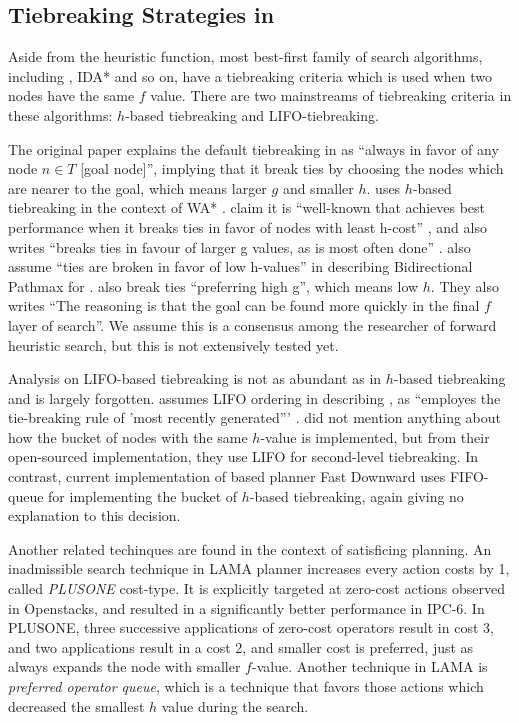 \subsection{Tiebreaking Strategies in \astar}

Aside from the heuristic function, most best-first family of search
algorithms, including \astar, IDA* and so on, have a tiebreaking criteria which is used
when two nodes have the same $f$ value.
There are two mainstreams of tiebreaking criteria in these algorithms:
$h$-based tiebreaking and LIFO-tiebreaking.

The original \astar paper \cite{hart1968formal} explains the default
tiebreaking in \astar as ``always in favor of any node $n \in T$ [goal
node]'', implying that it break ties by choosing the nodes which are
nearer to the goal, which means larger $g$ and smaller $h$.
\citeauthor{Korf1985depth} uses $h$-based tiebreaking in the context of WA*
\cite{korf1993linear}.  \citeauthor{hansen2007anytime} claim it is
``well-known that \astar achieves best performance when it breaks ties
in favor of nodes with least h-cost'' \cite{hansen2007anytime}, and
\citeauthor{holte2010common} also writes ``\astar breaks ties in favour
of larger g values, as is most often done'' \cite{holte2010common}.
\citeauthor{felner2011inconsistent} also assume ``ties are broken in
favor of low h-values'' in describing Bidirectional Pathmax for \astar.
\citeauthor{burns2012implementing} also break ties ``preferring high
g'', which means low $h$. They also writes ``The reasoning is that the
goal can be found more quickly in the final $f$ layer of search''. We
assume this is a consensus among the researcher of forward heuristic
search, but this is not extensively tested yet.

Analysis on LIFO-based tiebreaking is not as abundant as in $h$-based
tiebreaking and is largely forgotten.
\citeauthor{Korf1985depth} assumes LIFO ordering in describing \astar,
as ``\astar employes the tie-breaking rule of 'most
recently generated''' \cite{Korf1985depth}.
\citeauthor{burns2012implementing} did not mention anything about how
the bucket of nodes with the same $h$-value is implemented, but from their
open-sourced implementation, they use LIFO for second-level tiebreaking. 
In contrast, current implementation of \sota \astar based planner Fast
Downward \cite{Helmert2006} uses FIFO-queue for implementing the bucket
of $h$-based tiebreaking, again giving no explanation to this decision.

Another related techinques are found in the context of satisficing planning.
An inadmissible search technique in LAMA planner \cite{richter2010lama}
increases every action costs by 1, called \emph{PLUSONE} cost-type.
It is explicitly targeted at zero-cost actions observed in Openstacks,
and resulted in a significantly better performance in IPC-6.
In PLUSONE, three successive
applications of zero-cost operators result in cost 3, and two
applications result in a cost 2, and smaller cost is preferred, just as
\astar always expands the node with smaller $f$-value.
Another technique in LAMA is \emph{preferred operator queue},
which is a technique that favors those actions which decreased the
smallest $h$ value during the search.

